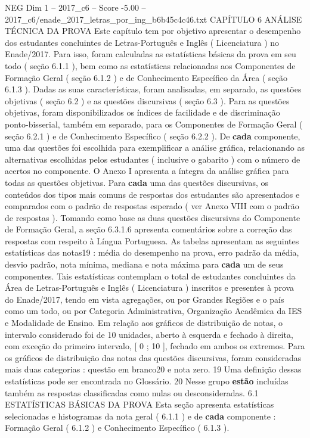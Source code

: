 \begin{textsample}{NEG Dim 1 – 2017\_c6 – Score -5.00 – 2017\_c6/enade\_2017\_letras\_por\_ing\_b6b45c4c46.txt}  \label{ex:f1_neg_145}
CAPÍTULO 6 ANÁLISE TÉCNICA DA PROVA Este capítulo tem por objetivo apresentar o desempenho dos estudantes concluintes de Letras-Português e Inglês ( Licenciatura ) no Enade/2017.
Para isso, foram calculadas as estatísticas básicas da prova em seu todo ( seção 6.1.1 ), bem como as estatísticas relacionadas aos Componentes de Formação Geral ( seção 6.1.2 ) e de Conhecimento Específico da Área ( seção 6.1.3 ).
Dadas as suas características, foram analisadas, em separado, as questões objetivas ( seção 6.2 ) e as questões discursivas ( seção 6.3 ).
Para as questões objetivas, foram disponibilizados os índices de facilidade e de discriminação ponto-bisserial, também em separado, para os Componentes de Formação Geral ( seção 6.2.1 ) e de Conhecimento Específico ( seção 6.2.2 ).
De \textbf{cada} componente, uma das questões foi escolhida para exemplificar a análise gráfica, relacionando as alternativas escolhidas pelos estudantes ( inclusive o gabarito ) com o número de acertos no componente.
O Anexo I apresenta a íntegra da análise gráfica para todas as questões objetivas.
Para \textbf{cada} uma das questões discursivas, os conteúdos dos tipos mais comuns de respostas dos estudantes são apresentados e comparados com o padrão de respostas esperado ( ver Anexo VIII com o padrão de respostas ).
Tomando como base as duas questões discursivas do Componente de Formação Geral, a seção 6.3.1.6 apresenta comentários sobre a correção das respostas com respeito à Língua Portuguesa.
As tabelas apresentam as seguintes estatísticas das notas19 : média do desempenho na prova, erro padrão da média, desvio padrão, nota mínima, mediana e nota máxima para \textbf{cada} um de seus componentes.
Tais estatísticas contemplam o total de estudantes concluintes da Área de Letras-Português e Inglês ( Licenciatura ) inscritos e presentes à prova do Enade/2017, tendo em vista agregações, ou por Grandes Regiões e o país como um todo, ou por Categoria Administrativa, Organização Acadêmica da IES e Modalidade de Ensino.
Em relação aos gráficos de distribuição de notas, o intervalo considerado foi de 10 unidades, aberto à esquerda e fechado à direita, com exceção do primeiro intervalo, [ 0 ; 10 ], fechado em ambos os extremos.
Para os gráficos de distribuição das notas das questões discursivas, foram consideradas mais duas categorias : questão em branco20 e nota zero. 19 Uma definição dessas estatísticas pode ser encontrada no Glossário. 20 Nesse grupo \textbf{estão} incluídas também as respostas classificadas como nulas ou desconsideradas. 6.1 ESTATÍSTICAS BÁSICAS DA PROVA Esta seção apresenta estatísticas selecionadas e histogramas da nota geral ( 6.1.1 ) e de \textbf{cada} componente : Formação Geral ( 6.1.2 ) e Conhecimento Específico ( 6.1.3 ).

\end{textsample}
